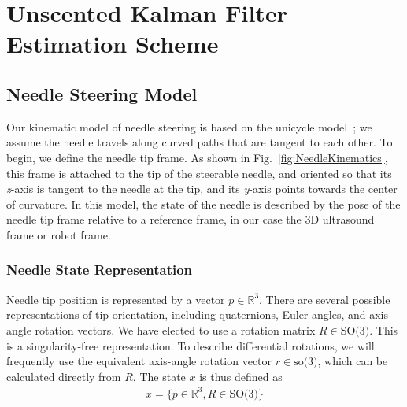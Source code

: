 \section[UKF Estimation Scheme]{Unscented Kalman Filter Estimation Scheme}
\label{sec:UKF}
\subsection{Needle Steering Model}
Our kinematic model of needle steering is based on the unicycle model~\cite{Webster2006}; we assume the needle travels along curved paths that are tangent to each other. To begin, we define the needle tip frame. As shown in Fig.~\ref{fig:NeedleKinematics}, this frame is attached to the tip of the steerable needle, and oriented so that its \textit{z}-axis is tangent to the needle at the tip, and its \textit{y}-axis points towards the center of curvature. In this model, the state of the needle is described by the pose of the needle tip frame relative to a reference frame, in our case the 3D ultrasound frame or robot frame. 

\subsubsection{Needle State Representation}
Needle tip position is represented by a vector ${p} \in \mathbb{R}^3$. There are several possible representations of tip orientation, including quaternions, Euler angles, and axis-angle rotation vectors. We have elected to use a rotation matrix ${R} \in \textrm{SO(3)}$. This is a singularity-free representation. To describe differential rotations, we will frequently use the equivalent axis-angle rotation vector $r \in \textrm{so(3)}$, which can be calculated directly from ${R}$. The state ${x}$ is thus defined as
\begin{align}
{x} = \{p \in \mathbb{R}^3, R \in \textrm{SO(3)}\}
\end{align}

